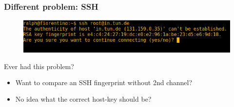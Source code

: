 

\begin{frame}
\frametitle{Different problem: SSH}
\begin{figure}[t]
  \centering
  \includegraphics[scale=.65]{figures/ssh-connect.png}
\end{figure}
\begin{block}{Ever had this problem?}
\begin{itemize}
  \item Want to compare an SSH fingerprint without 2nd channel?
  \item No idea what the correct host-key should be?
\end{itemize}
\end{block}
\end{frame}









